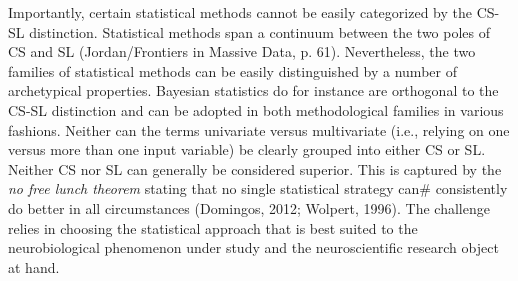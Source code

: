 \documentclass[authoryear,review,3p]{elsarticle}
\begin{document}
Importantly, certain statistical
methods cannot be easily categorized by the CS-SL distinction.
Statistical methods span a continuum between the two poles of CS and SL
(Jordan/Frontiers in Massive Data, p. 61).
Nevertheless, the two families of statistical methods
can be easily distinguished by a number of archetypical properties.
Bayesian statistics do for instance are orthogonal to the CS-SL distinction
and can be adopted in both methodological families in various fashions.
Neither can the terms univariate versus multivariate
(i.e., relying on one versus more than one input variable)
be clearly grouped into either CS or SL.
%
Neither CS nor SL can generally be considered superior.
This is captured by the \textit{no free lunch theorem}
stating that no single statistical strategy can#
consistently do better in all circumstances (Domingos, 2012; Wolpert, 1996).
The challenge relies in choosing
the statistical approach that is best suited
to the neurobiological phenomenon under study and the neuroscientific research object at hand.
\end{document}
